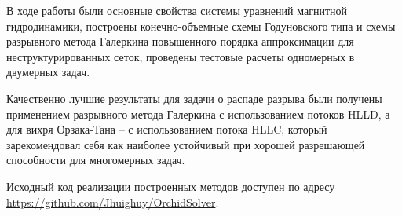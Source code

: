 \documentclass[14pt, a4paper, fleqn]{extreport}
\begin{document}
    В ходе работы были основные свойства системы уравнений магнитной 
    гидродинамики, построены конечно-объемные схемы Годуновского типа
    и схемы разрывного метода Галеркина повышенного порядка аппроксимации
    для неструктурированных сеток, проведены тестовые расчеты
    одномерных в двумерных задач.
    
    Качественно лучшие результаты для задачи о распаде разрыва
    были получены применением разрывного метода Галеркина 
    с использованием потоков HLLD,
    а для вихря Орзака-Тана -- с использованием потока HLLC, который
    зарекомендовал себя как наиболее устойчивый при хорошей 
    разрешающей способности для многомерных задач.
    
    Исходный код реализации построенных методов
    доступен по адресу \\
    \url{https://github.com/Jhuighuy/OrchidSolver}.
    
    
    \clearpage
    
    
    
    
    
    
    
    
\end{document}
